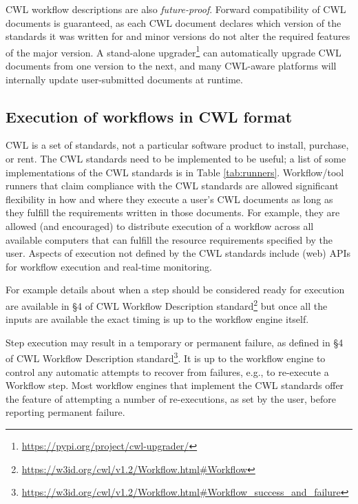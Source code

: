 \documentclass[sigconf,revew,screen,timestamp,nonacm]{acmart}
\newcommand{\addition}[1]{{\color{brown} #1}}
\newcommand{\todorone}[1]{\todo[color=orange!40]{R1.#1}}
\begin{document}
CWL workflow descriptions are also \textit{future-proof}. Forward compatibility of CWL documents is guaranteed, as each CWL document declares which version of the standards it was written for and minor versions do not alter the required features of the major version. A stand-alone upgrader\footnote{\url{https://pypi.org/project/cwl-upgrader/}} can automatically upgrade CWL documents from one version to the next, and many CWL-aware platforms will internally update user-submitted documents at runtime.


\addition{
\subsection{Execution of workflows in CWL format} \label{sec:execution}
\todorone{1}\todorone{3}CWL is a set of standards, not a particular software product to install, purchase, or rent. The CWL standards need to be implemented to be useful; a list of some implementations of the CWL standards is in Table \ref{tab:runners}. Workflow/tool runners that claim compliance with the CWL standards are allowed significant flexibility in how and where they execute a user's CWL documents as long as they fulfill the requirements written in those documents. For example, they are allowed (and encouraged) to \todorone{6}distribute execution of a workflow across all available computers that can fulfill the resource requirements specified by the user. \todorone{5}Aspects of execution not defined by the CWL standards include (web) APIs for workflow execution and real-time monitoring.

For example details about when a step should be considered ready for execution are available in §4 of CWL Workflow Description standard\footnote{\url{https://w3id.org/cwl/v1.2/Workflow.html\#Workflow}} but once all the inputs are available the exact timing is up to the workflow engine itself. 

\todorone{4}Step execution may result in a temporary or permanent failure, as defined in §4 of CWL Workflow Description standard\footnote{\url{https://w3id.org/cwl/v1.2/Workflow.html\#Workflow_success_and_failure}}. It is up to the workflow engine to control any automatic attempts to recover from failures, e.g., to re-execute a Workflow step. Most workflow engines that implement the CWL standards offer the feature of attempting a number of re-executions, as set by the user, before reporting permanent failure.

}
\end{document}
